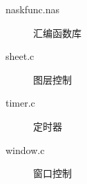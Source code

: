 \begin{description}
    \item[naskfunc.nas] 汇编函数库                                                                                                                                      
    \item[sheet.c] 图层控制                                                                                                                                           
    \item[timer.c] 定时器                                                                                                                                           
    \item[window.c] 窗口控制
\end{description}





